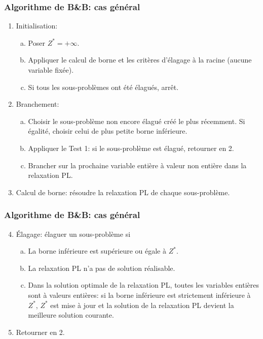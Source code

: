 \documentclass[usepdftitle=false, aspectratio=169]{beamer}
\begin{document}
\begin{frame}
\frametitle{Algorithme de B\&B: cas général}

\begin{enumerate}
\item
Initialisation:
\begin{enumerate}[(a)]
\item
Poser $Z^* = +\infty$.
\item
Appliquer le calcul de borne et les critères d'élagage à la racine (aucune variable fixée).
\item
Si tous les sous-problèmes ont été élagués, arrêt.
\end{enumerate}
\item
Branchement:
\begin{enumerate}[(a)]
\item
Choisir le sous-problème non encore élagué créé le plus récemment. Si égalité, choisir celui de plus petite borne inférieure.
\item
Appliquer le Test 1: si le sous-problème est élagué, retourner en 2.
\item
Brancher sur la prochaine variable entière à valeur non entière dans la relaxation PL.
\end{enumerate}
\item
Calcul de borne: résoudre la relaxation PL de chaque sous-problème.
\end{enumerate}

\end{frame}

\begin{frame}
\frametitle{Algorithme de B\&B: cas général}

\begin{enumerate}
\setcounter{enumi}{3}
\item
Élagage: élaguer un sous-problème si
\begin{enumerate}[(a)]
\item
La borne inférieure est supérieure ou égale à $Z^*$.
\item
La relaxation PL n'a pas de solution réalisable.
\item
Dans la solution optimale de la relaxation PL, toutes les variables entières sont à valeurs entières: si la borne
inférieure est strictement inférieure à $Z^*$, $Z^*$ est mise à jour et la solution de la relaxation PL devient la meilleure solution courante.
\end{enumerate}
\item
Retourner en 2.
\end{enumerate}

\end{frame}
\end{document}
